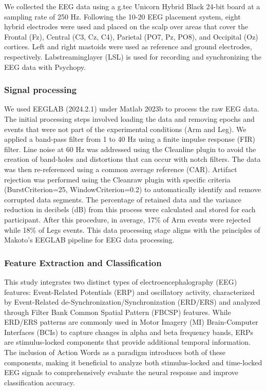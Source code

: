 \documentclass[10pt,letterpaper]{article}
\begin{document}
We collected the EEG data using a g.tec Unicorn Hybrid Black 24-bit board at a sampling rate of 250 Hz. Following the 10-20 EEG placement system, eight hybrid electrodes were used and placed on the scalp over areas that cover the Frontal (Fz), Central (C3, Cz, C4), Parietal (PO7, Pz, PO8), and Occipital (Oz) cortices. Left and right mastoids were used as reference and ground electrodes, respectively. Labstreaminglayer (LSL) is used for recording and synchronizing the EEG data with Psychopy.


\subsubsection{Signal processing}

We used EEGLAB (2024.2.1) \cite{delorme46} under Matlab 2023b to process the raw EEG data. The initial processing steps involved loading the data and removing epochs and events that were not part of the experimental conditions (Arm and Leg). We applied a band-pass filter from 1 to 40 Hz using a finite impulse response (FIR) filter. Line noise at 60 Hz was addressed using the Cleanline plugin to avoid the creation of band-holes and distortions that can occur with notch filters. The data was then re-referenced using a common average reference (CAR). Artifact rejection was performed using the Cleanraw plugin with specific criteria (BurstCriterion=25, WindowCriterion=0.2) to automatically identify and remove corrupted data segments. The percentage of retained data and the variance reduction in decibels (dB) from this process were calculated and stored for each participant. After this procedure, in average, 17\% of Arm events were rejected while 18\% of Legs events. This data processing stage aligns with the principles of Makoto's EEGLAB pipeline for EEG data processing.\cite{makotopipeline}

\subsubsection{Feature Extraction and Classification}

This study integrates two distinct types of electroencephalography (EEG) features: Event-Related Potentials (ERP) and oscillatory activity, characterized by Event-Related de-Synchronization/Synchronization (ERD/ERS) and analyzed through Filter Bank Common Spatial Pattern (FBCSP) features. While ERD/ERS patterns are commonly used in Motor Imagery (MI) Brain-Computer Interfaces (BCIs) to capture changes in alpha and beta frequency bands, ERPs are stimulus-locked components that provide additional temporal information. The inclusion of Action Words as a paradigm introduces both of these components, making it beneficial to analyze both stimulus-locked and time-locked EEG signals to comprehensively evaluate the neural response and improve classification accuracy.
\end{document}
